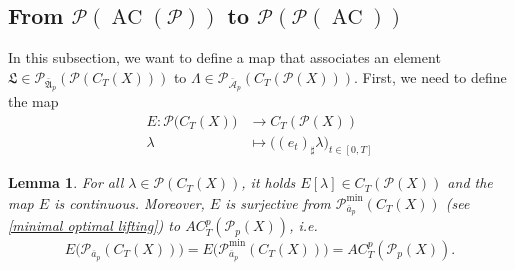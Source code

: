 \documentclass[10pt,leqno]{amsart}
\numberwithin{equation}{section}
\newtheorem{lemma}[teorema]{Lemma}
\newcommand{\PP}{\mathcal{P}}
\begin{document}
\subsection{From \texorpdfstring{$\PP(\operatorname{AC}(\PP))$}{} to \texorpdfstring{$\PP(\PP(\operatorname{AC}))$}{}}\label{metric from P(AC(P)) to P(P(AC))}
In this subsection, we want to define a map that associates an element $\mathfrak{L}\in \PP_{\bar{\mathfrak{A}}_p}(\PP(C_T(X)))$ to $\Lambda\in \PP_{\bar{\mathcal{A}}_p}(C_T(\PP(X)))$. First, we need to define the map
\begin{equation}\label{def of E, section 3}
    \begin{aligned}   
        E:\PP\big(C_T(X)\big) & \to C_T(\PP(X))
        \\
        \lambda \quad & \mapsto\big((e_t)_\sharp  \lambda\big)_{t\in[0,T]}
    \end{aligned}
    \end{equation}
\begin{lemma}\label{well posedeness of E}
    For all $\lambda \in \PP(C_T(X))$, it holds $E[\lambda] \in C_T(\PP(X))$ and the map $E$ is continuous. 
    Moreover, $E$ is surjective from $\PP^{\operatorname{min}}_{\overline{a}_p}(C_T(X))$ (see \eqref{minimal optimal lifting}) to $AC_T^p(\PP_p(X))$, i.e.
    \begin{equation}
        E\big(\PP_{\overline{a}_p}(C_T(X))\big) = E\big(\PP_{\overline{a}_p}^{\operatorname{min}}(C_T(X))\big) = AC^p_T(\PP_p(X)).
    \end{equation}
\end{lemma}
\end{document}
